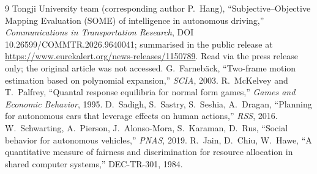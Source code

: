 \documentclass[11pt,a4paper]{article}
\begin{document}
\begin{thebibliography}{9}\small
{} Tongji University team (corresponding author P.~Hang), ``Subjective--Objective Mapping Evaluation (SOME) of intelligence in autonomous driving,'' \emph{Communications in Transportation Research}, DOI 10.26599/COMMTR.2026.9640041; summarised in the public release at \url{https://www.eurekalert.org/news-releases/1150789}. Read via the press release only; the original article was not accessed.
 G.~Farneb\"ack, ``Two-frame motion estimation based on polynomial expansion,'' \emph{SCIA}, 2003.
 R.~McKelvey and T.~Palfrey, ``Quantal response equilibria for normal form games,'' \emph{Games and Economic Behavior}, 1995.
 D.~Sadigh, S.~Sastry, S.~Seshia, A.~Dragan, ``Planning for autonomous cars that leverage effects on human actions,'' \emph{RSS}, 2016.
 W.~Schwarting, A.~Pierson, J.~Alonso-Mora, S.~Karaman, D.~Rus, ``Social behavior for autonomous vehicles,'' \emph{PNAS}, 2019.
 R.~Jain, D.~Chiu, W.~Hawe, ``A quantitative measure of fairness and discrimination for resource allocation in shared computer systems,'' DEC-TR-301, 1984.
\end{thebibliography}
\end{document}

